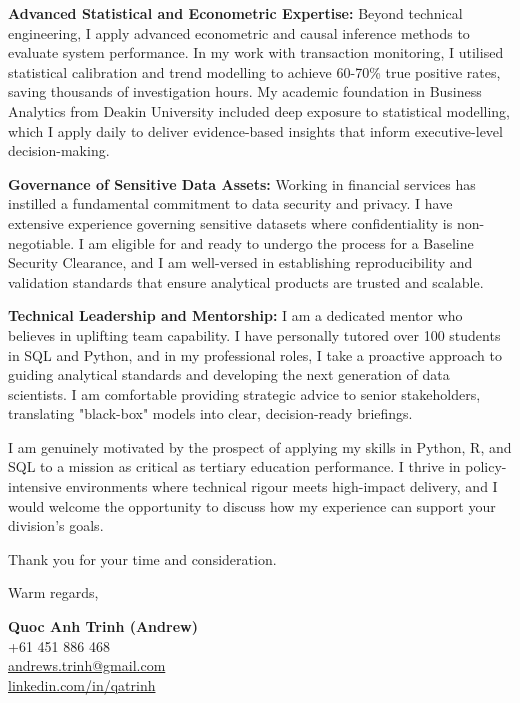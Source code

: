 \documentclass[11pt, a4paper]{article}
\begin{document}
\textbf{Advanced Statistical and Econometric Expertise:}
Beyond technical engineering, I apply advanced econometric and causal inference methods to evaluate system performance. In my work with transaction monitoring, I utilised statistical calibration and trend modelling to achieve 60-70\% true positive rates, saving thousands of investigation hours. My academic foundation in Business Analytics from Deakin University included deep exposure to statistical modelling, which I apply daily to deliver evidence-based insights that inform executive-level decision-making.

\textbf{Governance of Sensitive Data Assets:}
Working in financial services has instilled a fundamental commitment to data security and privacy. I have extensive experience governing sensitive datasets where confidentiality is non-negotiable. I am eligible for and ready to undergo the process for a Baseline Security Clearance, and I am well-versed in establishing reproducibility and validation standards that ensure analytical products are trusted and scalable.

\textbf{Technical Leadership and Mentorship:}
I am a dedicated mentor who believes in uplifting team capability. I have personally tutored over 100 students in SQL and Python, and in my professional roles, I take a proactive approach to guiding analytical standards and developing the next generation of data scientists. I am comfortable providing strategic advice to senior stakeholders, translating "black-box" models into clear, decision-ready briefings.

I am genuinely motivated by the prospect of applying my skills in Python, R, and SQL to a mission as critical as tertiary education performance. I thrive in policy-intensive environments where technical rigour meets high-impact delivery, and I would welcome the opportunity to discuss how my experience can support your division’s goals.

Thank you for your time and consideration.

\vspace{20pt}

Warm regards,

\vspace{30pt}

\textbf{Quoc Anh Trinh (Andrew)}\\
+61 451 886 468\\
\href{mailto:andrews.trinh@gmail.com}{andrews.trinh@gmail.com}\\
\href{https://www.linkedin.com/in/qatrinh}{linkedin.com/in/qatrinh}
\end{document}
